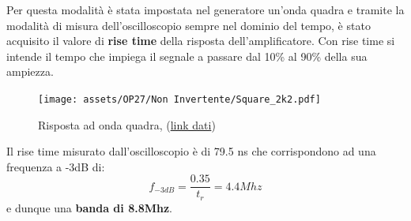 Per questa modalità è stata impostata nel generatore un'onda quadra e tramite la modalità di misura dell'oscilloscopio sempre nel dominio del tempo, è stato acquisito il valore di \textbf{rise time} della risposta dell'amplificatore. Con rise time si intende il tempo che impiega il segnale a passare dal 10\% al 90\% della sua ampiezza.

\begin{figure}[!h]
    \centering
    \texttt{[image: assets/OP27/Non Invertente/Square\_2k2.pdf]}
    \caption{Risposta ad onda quadra, (\href{https://github.com/Yedi278/Esperimentazioni-Elettronica/tree/main/-\%20OPAMP/OP27/Non-Invertente/R1\%3D2.2k\%2CR2\%3D2.2k}{link dati})}
\end{figure}
\pagebreak

Il rise time misurato dall'oscilloscopio è di 79.5 ns che corrispondono ad una frequenza a -3dB di:
$$f_{-3dB} = \frac{0.35}{t_r} = 4.4Mhz$$ e dunque una \textbf{banda di 8.8Mhz}.








